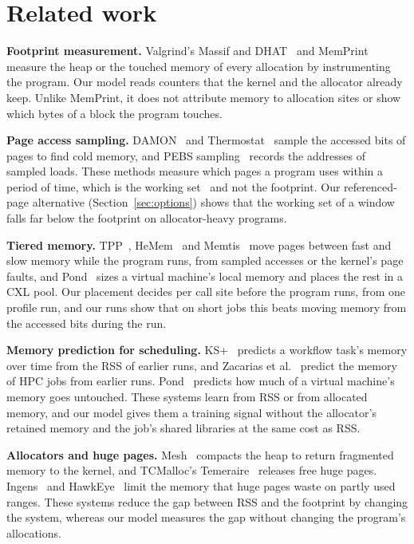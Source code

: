 \documentclass[11pt]{article}
\newcommand{\memprint}{MemPrint}
\newcommand{\secref}[1]{Section~\ref{#1}}
\begin{document}
\section{Related work}
\label{sec:related}

\textbf{Footprint measurement.} Valgrind's Massif and DHAT~\cite{Nethercote2007Valgrind,dhat} and \memprint{} measure
the heap or the touched memory of every allocation by instrumenting the program. Our model reads counters that the
kernel and the allocator already keep. Unlike \memprint{}, it does not attribute memory to allocation sites or show
which bytes of a block the program touches.

\textbf{Page access sampling.} DAMON~\cite{park2019damon} and Thermostat~\cite{agarwal2017thermostat} sample the
accessed bits of pages to find cold memory, and PEBS sampling~\cite{roca_nonell2020pebs} records the addresses of
sampled loads. These methods measure which pages a program uses within a period of time, which is the working
set~\cite{denning1968} and not the footprint. Our referenced-page alternative (\secref{sec:options}) shows that the
working set of a window falls far below the footprint on allocator-heavy programs.

\textbf{Tiered memory.} TPP~\cite{Maruf2023TPP}, HeMem~\cite{Raybuck2021HeMem} and Memtis~\cite{Lee2023Memtis}
move pages between fast and slow memory while the program runs, from sampled accesses or the kernel's page faults,
and Pond~\cite{Li2023Pond} sizes a virtual machine's local memory and places the rest in a CXL pool. Our placement
decides per call site before the program runs, from one profile run, and our runs show that on short jobs this beats
moving memory from the accessed bits during the run.

\textbf{Memory prediction for scheduling.} KS+~\cite{KSplus2024} predicts a workflow task's memory over time from the
RSS of earlier runs, and Zacarias et al.~\cite{Zacarias2021Accurate,Zacarias2023Dynamic} predict the memory of HPC jobs
from earlier runs. Pond~\cite{Li2023Pond} predicts how much of a virtual machine's memory goes untouched. These systems
learn from RSS or from allocated memory, and our model gives them a training signal without the allocator's retained
memory and the job's shared libraries at the same cost as RSS.

\textbf{Allocators and huge pages.} Mesh~\cite{Powers2019Mesh} compacts the heap to return fragmented memory to the
kernel, and TCMalloc's Temeraire~\cite{Hunter2021Temeraire} releases free huge pages. Ingens~\cite{Kwon2016Ingens} and
HawkEye~\cite{Panwar2019HawkEye} limit the memory that huge pages waste on partly used ranges. These systems reduce the
gap between RSS and the footprint by changing the system, whereas our model measures the gap without changing the
program's allocations.
\end{document}
